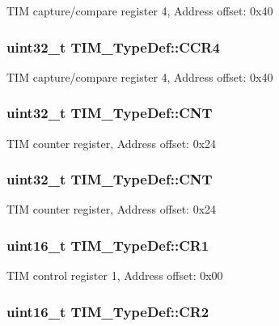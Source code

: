 T\-I\-M capture/compare register 4, Address offset\-: 0x40 \hypertarget{struct_t_i_m___type_def_a5ba381c3f312fdf5e0b4119641b3b0aa}{
\subsubsection[{C\-C\-R4}]{ uint32\-\_\-t T\-I\-M\-\_\-\-Type\-Def\-::\-C\-C\-R4}}\label{struct_t_i_m___type_def_a5ba381c3f312fdf5e0b4119641b3b0aa}
T\-I\-M capture/compare register 4, Address offset\-: 0x40 \hypertarget{struct_t_i_m___type_def_a6fdd2a7fb88d28670b472aaac0d9d262}{
\subsubsection[{C\-N\-T}]{ uint32\-\_\-t T\-I\-M\-\_\-\-Type\-Def\-::\-C\-N\-T}}\label{struct_t_i_m___type_def_a6fdd2a7fb88d28670b472aaac0d9d262}
T\-I\-M counter register, Address offset\-: 0x24 \hypertarget{struct_t_i_m___type_def_a6fdd2a7fb88d28670b472aaac0d9d262}{
\subsubsection[{C\-N\-T}]{ uint32\-\_\-t T\-I\-M\-\_\-\-Type\-Def\-::\-C\-N\-T}}\label{struct_t_i_m___type_def_a6fdd2a7fb88d28670b472aaac0d9d262}
T\-I\-M counter register, Address offset\-: 0x24 \hypertarget{struct_t_i_m___type_def_a410988826004fdd21d55071215144ba9}{
\subsubsection[{C\-R1}]{ uint16\-\_\-t T\-I\-M\-\_\-\-Type\-Def\-::\-C\-R1}}\label{struct_t_i_m___type_def_a410988826004fdd21d55071215144ba9}
T\-I\-M control register 1, Address offset\-: 0x00 \hypertarget{struct_t_i_m___type_def_a954eb69fd4e2e6b43ba6c80986f691d8}{
\subsubsection[{C\-R2}]{ uint16\-\_\-t T\-I\-M\-\_\-\-Type\-Def\-::\-C\-R2}}\label{struct_t_i_m___type_def_a954eb69fd4e2e6b43ba6c80986f691d8}
